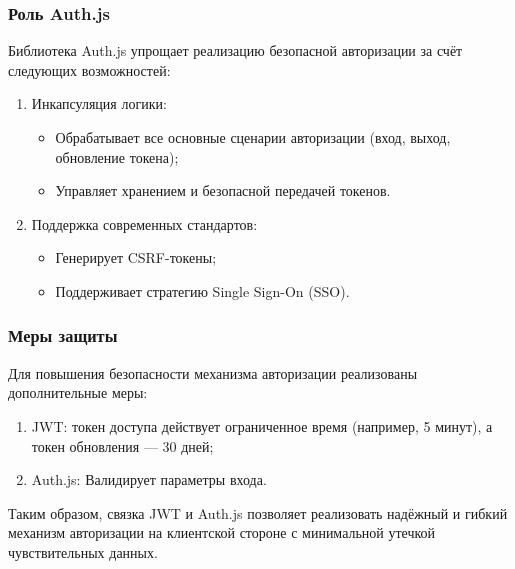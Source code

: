 \subsubsection{Роль Auth.js}
Библиотека Auth.js упрощает реализацию безопасной авторизации за счёт следующих возможностей:
\begin{enumerate}
  \item Инкапсуляция логики:
    \begin{itemize}
      \item Обрабатывает все основные сценарии авторизации (вход, выход, обновление токена);
      \item Управляет хранением и безопасной передачей токенов.
    \end{itemize}
  \item Поддержка современных стандартов:
    \begin{itemize}
      \item Генерирует CSRF-токены;
      \item Поддерживает стратегию Single Sign-On (SSO).
    \end{itemize}
\end{enumerate}

\subsubsection{Меры защиты}
Для повышения безопасности механизма авторизации реализованы дополнительные меры:

\begin{enumerate}
  \item JWT: токен доступа действует ограниченное время (например, 5 минут), а токен обновления — 30 дней;
  \item Auth.js: Валидирует параметры входа.
\end{enumerate}

Таким образом, связка JWT и Auth.js позволяет реализовать надёжный и гибкий механизм авторизации на клиентской стороне с минимальной утечкой чувствительных данных.